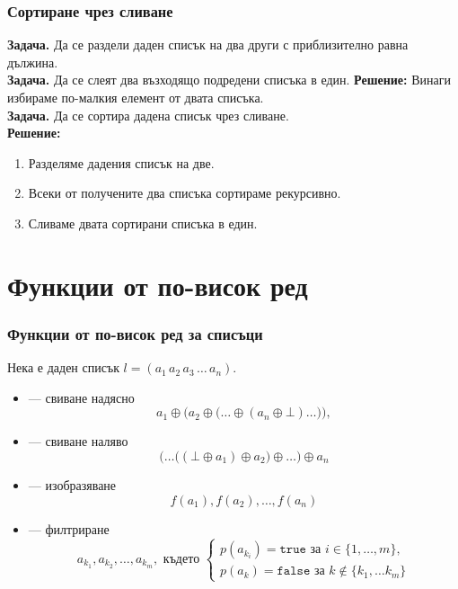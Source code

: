 \documentclass[alsotrans]{beamerswitch}
\begin{document}
\begin{frame}
  \frametitle{Сортиране чрез сливане}

  \textbf{Задача.} Да се раздели даден списък на два други с приблизително равна дължина.\\[2ex]
  \pause
  \textbf{Задача.} Да се слеят два възходящо подредени списъка в един.
  \pause
  \textbf{Решение:} Винаги избираме по-малкия елемент от двата списъка.\\[2ex]
  \pause
  \textbf{Задача.} Да се сортира дадена списък чрез сливане.\\
  \pause
  \textbf{Решение:}
  \begin{enumerate}
  \item Разделяме дадения списък на две.
  \item Всеки от получените два списъка сортираме рекурсивно.
  \item Сливаме двата сортирани списъка в един.
  \end{enumerate}
\end{frame}

\section{Функции от по-висок ред}

\begin{frame}
  \frametitle{Функции от по-висок ред за списъци}

  Нека е даден списък $l = (a_1\,a_2\,a_3\,\ldots\,a_n)$.\\
  \begin{itemize}[<+->]
  \item {} --- свиване надясно
    \begin{equation*}
      a_1 \oplus \Big(a_2 \oplus \big(\ldots \oplus (a_n \oplus \bot) \ldots\big)\Big),
    \end{equation*}
  \item {} --- свиване наляво
    \begin{equation*}
      \Big(\ldots\big((\bot \oplus a_1) \oplus a_2\big) \oplus \ldots\Big) \oplus a_n
    \end{equation*}
  \item {} --- изобразяване
    \begin{equation*}
      f(a_1), f(a_2), \ldots, f(a_n)
    \end{equation*}
  \item {} --- филтриране
    \begin{equation*}
      a_{k_1}, a_{k_2}, \ldots, a_{k_m},\text{ където }\left\{
      \begin{array}{l}
        p(a_{k_i})=\mathtt{true}\text{ за }i\in\{1,\ldots,m\},\\
        p(a_k)=\mathtt{false}\text{ за }k\notin\{k_1,\ldots k_m\}
      \end{array}\right.
    \end{equation*}
  \end{itemize}
\end{frame}
\end{document}
